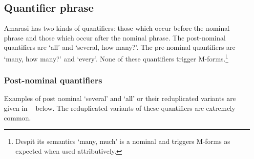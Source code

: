 \subsection{Quantifier phrase}\label{sec:QuaPhr}
Amarasi has two kinds of quantifiers: those which occur before the nominal phrase
and those which occur after the nominal phrase.
The post-nominal quantifiers are  `all' and  `several, how many?'.
The pre-nominal quantifiers are  `many, how many?' and  `every'.
None of these quantifiers trigger M-forms.\footnote{
		Despit its semantics  `many, much' is a nominal
		and triggers M-forms as expected when used attributively.}

\subsubsection{Post-nominal quantifiers}
Examples of post nominal  `several' and  `all'
or their reduplicated variants are given in
-- below.
The reduplicated variants of these quantifiers are extremely common.

\begin{exe}
	\label{ex:130920-1, 4.53-4.56}
	\label{ex:Acts 21:10}
	\label{ex:Genesis 25:24}
	\label{ex:Genesis 8:17}
\end{exe}

